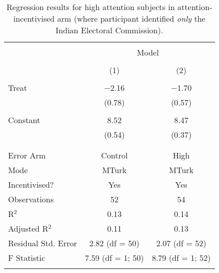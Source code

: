 
\begin{table}[!htbp]
\centering
\begin{tabular}{@{\extracolsep{5pt}}lcc}
\\[-1.8ex]\hline
\hline \\[-1.8ex]
 & \multicolumn{2}{c}{Model} \\
\cline{2-3}
\\[-1.8ex] & (1) & (2)\\
\hline \\[-1.8ex]
 Treat & $-$2.16 & $-$1.70 \\
  & (0.78) & (0.57) \\
  & & \\
 Constant & 8.52 & 8.47 \\
  & (0.54) & (0.37) \\
  & & \\
\hline \\[-1.8ex]
Error Arm & Control & High \\
Mode & MTurk & MTurk \\
Incentivised? & Yes & Yes \\
Observations & 52 & 54 \\
R$^{2}$ & 0.13 & 0.14 \\
Adjusted R$^{2}$ & 0.11 & 0.13 \\
Residual Std. Error & 2.82 (df = 50) & 2.07 (df = 52) \\
F Statistic & 7.59 (df = 1; 50) & 8.79 (df = 1; 52) \\
\hline
\hline \\[-1.8ex]
\end{tabular}
\caption{Regression results for high attention subjects in attention-incentivised arm (where participant identified \textit{only} the Indian Electoral Commission).}
\label{tab:india_robust_attention_iec_only}
\end{table}
